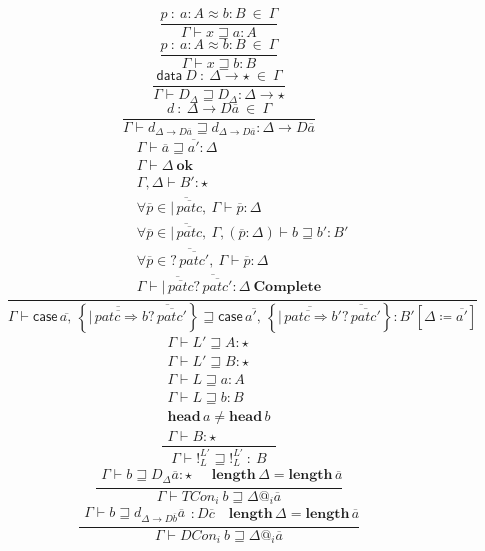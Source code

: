 \begin{figure}
\[
\frac{
  p\ :\ a:A\approx b:B\ \in\ \varGamma
}{
  \varGamma\vdash x\sqsupseteq a:A
  }
\]
\[
\frac{
  p\ :\ a:A\approx b:B\ \in\ \varGamma
}{\varGamma\vdash x\sqsupseteq b:B}
\]
\[
\frac{\mathsf{data}\ D\ :\ \Delta\rightarrow\star\ \in\ \varGamma}{\varGamma\vdash D_{\Delta}\sqsupseteq D_{\Delta}:\Delta\rightarrow\star}
\]
\[
\frac{d\ :\ \Delta\rightarrow D\overline{a}\ \in\ \varGamma}{\varGamma\vdash d_{\Delta\rightarrow D\overline{a}}\sqsupseteq d_{\Delta\rightarrow D\overline{a}}:\Delta\rightarrow D\overline{a}}
\]
\[
\frac{\begin{array}{c}
\varGamma\vdash\overline{a}\sqsupseteq\overline{a'}:\Delta\\
\varGamma\vdash\Delta\ \mathbf{ok}\\
\varGamma,\Delta\vdash B':\star\\
\forall\overline{p}\in\overline{|\,\overline{patc}},\:\varGamma\vdash\overline{p}:\Delta\\
\forall\overline{p}\in\overline{|\,\overline{patc}},\:\varGamma,\left(\overline{p}:\Delta\right)\vdash b\sqsupseteq b':B'\\
\forall\overline{p}\in\overline{?\,\overline{patc'}},\:\varGamma\vdash\overline{p}:\Delta\\
\varGamma\vdash\overline{|\,\overline{patc}}\overline{?\,\overline{patc'}}:\Delta\ \mathbf{Complete}
\end{array}}{
  \varGamma\vdash\mathsf{case}\,\overline{a,}\,\left\{ \overline{|\,\overline{patc\Rightarrow}b} \overline{?\,\overline{patc'}} \right\} \sqsupseteq\mathsf{case}\,\overline{a',}\,\left\{ \overline{|\,\overline{patc\Rightarrow}b'} \overline{?\,\overline{patc'}} \right\} :B'\left[\Delta\coloneqq\overline{a'}\right]}
\]
\[
\frac{\begin{array}{c}
\varGamma\vdash L'\sqsupseteq A:\star\\
\varGamma\vdash L'\sqsupseteq B:\star\\
\varGamma\vdash L\sqsupseteq a:A\\
\varGamma\vdash L\sqsupseteq b:B\\
\mathbf{head}\,a\neq\mathbf{head}\,b\\
\varGamma\vdash B:\star
\end{array}}{\varGamma\vdash!_{L}^{L'}\sqsupseteq!_{L}^{L'}\ :\ B}
\]
\[
\frac{\begin{array}{c}
\varGamma\vdash b\sqsupseteq D_{\Delta}\overline{a}:\star\end{array}\quad\mathbf{length}\,\Delta=\mathbf{length}\,\overline{a}}{\varGamma\vdash TCon_{i}\ b\sqsupseteq\Delta@_{i}\overline{a}}
\]
\[
\frac{\begin{array}{c}
\varGamma\vdash b\sqsupseteq d_{\Delta\rightarrow D\overline{b}}\overline{a}\end{array}:D\overline{c}\quad\mathbf{length}\,\Delta=\mathbf{length}\,\overline{a}}{\varGamma\vdash DCon_{i}\ b\sqsupseteq\Delta@_{i}\overline{a}}
\]



\end{figure}

